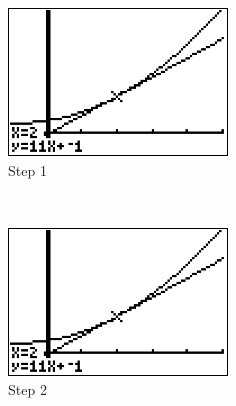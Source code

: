 \begin{figure}
    \centering
    \begin{subfigure}[b]{0.3\textwidth}
        \includegraphics[width=\textwidth]{./assets/20170509-123642}
        \caption{Step 1}
        \label{fig:step1}
    \end{subfigure}
    ~ %
    \begin{subfigure}[b]{0.3\textwidth}
        \includegraphics[width=\textwidth]{./assets/20170509-123642.png}
        \caption{Step 2}
        \label{fig:step2}
    \end{subfigure}
    ~ %
    \begin{subfigure}[b]{0.3\textwidth}

\end{subfigure}
\end{figure}
